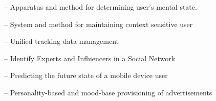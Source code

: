 \begin{Parskip}
 -- Apparatus and method for determining user's mental state.

 -- System and method for maintaining context sensitive
user

 -- Unified tracking data management

 -- Identify Experts and Influencers in a Social Network

 -- Predicting the future state of a mobile device user

 -- Personality-based and mood-base provisioning of
advertisements
\end{Parskip}